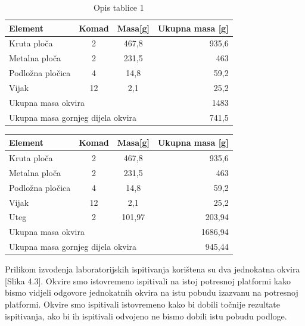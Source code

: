 \documentclass[12pt]{book}
\begin{document}
\begin{table}[H]
	\label{table1}
	\caption{Opis tablice 1}
	\begin{center}
		\begin{tabular}{|l|c|c|r|}
			\hline
			Element & Komad & Masa[g] & Ukupna masa [g]\\
			\hline
			Kruta ploča & 2 & 467,8 & 935,6\\
			\hline
			Metalna ploča & 2 & 231,5 & 463\\
			\hline
			Podložna pločica & 4 & 14,8 & 59,2 \\
			\hline
			Vijak & 12 & 2,1 & 25,2\\
			\hline
			\multicolumn{3}{|l|}{Ukupna masa okvira} & 1483\\
			\hline
			\multicolumn{3}{|l|}{Ukupna masa gornjeg dijela okvira} & 741,5\\
			\hline
		\end{tabular}
	\end{center}
\end{table}


\begin{table}[H]
	\begin{center}
		\begin{tabular}{|l|c|c|r|}
			\hline
			Element & Komad & Masa[g] & Ukupna masa [g]\\
			\hline
			Kruta ploča & 2 & 467,8 & 935,6\\
			\hline
			Metalna ploča & 2 & 231,5 & 463\\
			\hline
			Podložna pločica & 4 & 14,8 & 59,2 \\
			\hline
			Vijak & 12 & 2,1 & 25,2\\
			\hline
			Uteg & 2 & 101,97 & 203,94\\
			\hline
			\multicolumn{3}{|l|}{Ukupna masa okvira} & 1686,94\\
			\hline
			\multicolumn{3}{|l|}{Ukupna masa gornjeg dijela okvira} & 945,44\\
			\hline
		\end{tabular}
	\end{center}
\end{table}

Prilikom izvođenja laboratorijskih ispitivanja korištena su dva jednokatna okvira [Slika 4.3]. Okvire smo istovremeno ispitivali na istoj potresnoj platformi kako bismo vidjeli odgovore jednokatnih okvira na istu pobudu izazvanu na potresnoj platformi. Okvire smo ispitivali istovremeno kako bi dobili točnije rezultate ispitivanja, ako bi ih ispitivali odvojeno ne bismo dobili istu pobudu podloge.
\end{document}
